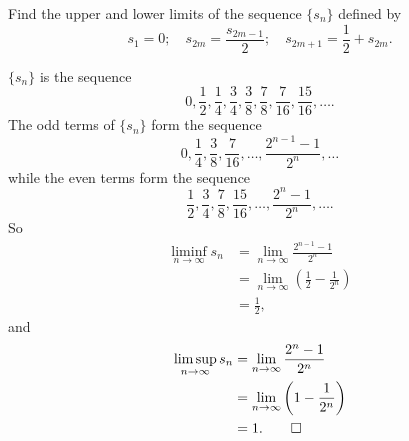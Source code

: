  Find the upper and lower limits of the sequence $\{s_n\}$
defined by
\begin{equation*}
  s_1 = 0;\quad s_{2m} = \frac{s_{2m-1}}2;
  \quad s_{2m+1} = \frac12 + s_{2m}.
\end{equation*}
\begin{solution}
  $\{s_n\}$ is the sequence
  \begin{equation*}
    0, \frac12, \frac14, \frac34, \frac38, \frac78,
    \frac7{16}, \frac{15}{16}, \dots.
  \end{equation*}
  The odd terms of $\{s_n\}$ form the sequence
  \begin{equation*}
    0, \frac14, \frac38, \frac7{16}, \dots, \frac{2^{n-1}-1}{2^n}, \dots
  \end{equation*}
  while the even terms form the sequence
  \begin{equation*}
    \frac12, \frac34, \frac78, \frac{15}{16}, \dots,
    \frac{2^n-1}{2^n}, \dots.
  \end{equation*}
  So
  \begin{align*}
    \liminf_{n\to\infty}s_n
    &= \lim_{n\to\infty}\frac{2^{n-1} - 1}{2^n} \\
    &= \lim_{n\to\infty}\left(\frac12 - \frac1{2^n}\right) \\
    &= \frac12,
  \end{align*}
  and
  \begin{align*}
    \limsup_{n\to\infty}s_n
    &= \lim_{n\to\infty}\frac{2^{n} - 1}{2^n} \\
    &= \lim_{n\to\infty}\left(1 - \frac1{2^n}\right) \\
    &= 1. \qedhere
  \end{align*}
\end{solution}


